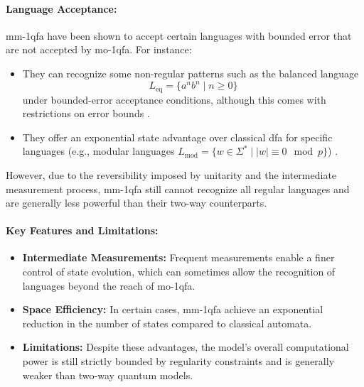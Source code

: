 \paragraph{Language Acceptance:}  
\gls{mm-1qfa} have been shown to accept certain languages with bounded error that are not accepted by \gls{mo-1qfa}. For instance:
\begin{itemize}
    \item They can recognize some non-regular patterns such as the balanced language 
    \[
    L_{\text{eq}} = \{a^n b^n \mid n \geq 0\}
    \]
    under bounded-error acceptance conditions, although this comes with restrictions on error bounds \cite{kondacs1997power}.
    \item They offer an exponential state advantage over classical \gls{dfa} for specific languages (e.g., modular languages \( L_{\text{mod}} = \{w \in \Sigma^* \mid |w| \equiv 0 \mod p\} \)) \cite{ambainis2009superiority}.
\end{itemize}
However, due to the reversibility imposed by unitarity and the intermediate measurement process, \gls{mm-1qfa} still cannot recognize all regular languages and are generally less powerful than their two-way counterparts.

\paragraph{Key Features and Limitations:}
\begin{itemize}
    \item \textbf{Intermediate Measurements:} Frequent measurements enable a finer control of state evolution, which can sometimes allow the recognition of languages beyond the reach of \gls{mo-1qfa}.
    \item \textbf{Space Efficiency:} In certain cases, \gls{mm-1qfa} achieve an exponential reduction in the number of states compared to classical automata.
    \item \textbf{Limitations:} Despite these advantages, the model’s overall computational power is still strictly bounded by regularity constraints and is generally weaker than two-way quantum models.
\end{itemize}

